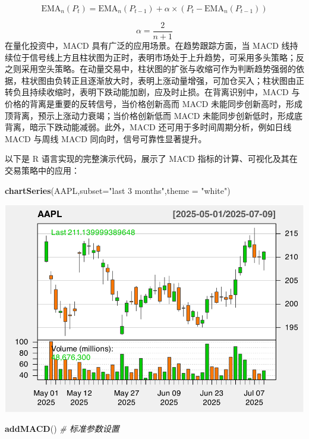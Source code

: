 \documentclass[]{ctexbook}
\newenvironment{Shaded}{\begin{snugshade}}{\end{snugshade}}
\newcommand{\AttributeTok}[1]{\textcolor[rgb]{0.13,0.29,0.53}{#1}}
\newcommand{\CommentTok}[1]{\textcolor[rgb]{0.56,0.35,0.01}{\textit{#1}}}
\newcommand{\FunctionTok}[1]{\textcolor[rgb]{0.13,0.29,0.53}{\textbf{#1}}}
\newcommand{\NormalTok}[1]{#1}
\newcommand{\StringTok}[1]{\textcolor[rgb]{0.31,0.60,0.02}{#1}}
\begin{document}
\[\text{EMA}_n(P_t) = \text{EMA}_{n}(P_{t-1}) + \alpha \times (P_t - \text{EMA}_{n}(P_{t-1}))\]

\[\alpha = \frac{2}{n + 1}\]
在量化投资中，MACD 具有广泛的应用场景。在趋势跟踪方面，当 MACD 线持续位于信号线上方且柱状图为正时，表明市场处于上升趋势，可采用多头策略；反之则采用空头策略。在动量交易中，柱状图的扩张与收缩可作为判断趋势强弱的依据，柱状图由负转正且逐渐放大时，表明上涨动量增强，可加仓买入；柱状图由正转负且持续收缩时，表明下跌动能加剧，应及时止损。在背离识别中，MACD 与价格的背离是重要的反转信号，当价格创新高而 MACD 未能同步创新高时，形成顶背离，预示上涨动力衰竭；当价格创新低而 MACD 未能同步创新低时，形成底背离，暗示下跌动能减弱。此外，MACD 还可用于多时间周期分析，例如日线 MACD 与周线 MACD 同向时，信号可靠性显著提升。

以下是 R 语言实现的完整演示代码，展示了 MACD 指标的计算、可视化及其在交易策略中的应用：

\begin{Shaded}
\begin{Highlighting}[]
\FunctionTok{chartSeries}\NormalTok{(AAPL,}\AttributeTok{subset=}\StringTok{"last 3 months"}\NormalTok{,}\AttributeTok{theme =} \StringTok{"white"}\NormalTok{)}
\end{Highlighting}
\end{Shaded}

\includegraphics[width=0.9\linewidth]{quantmod_files/figure-latex/macd-1}

\begin{Shaded}
\begin{Highlighting}[]
\FunctionTok{addMACD}\NormalTok{()  }\CommentTok{\# 标准参数设置}
\end{Highlighting}
\end{Shaded}
\end{document}
